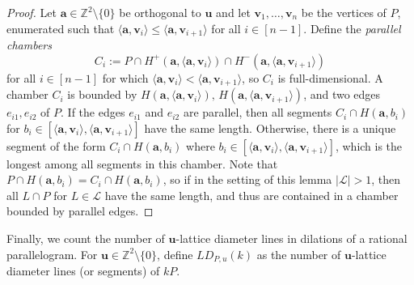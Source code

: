 \documentclass[11pt]{article}
\newcommand{\ba}{\mathbf{a}}
\newcommand{\bu}{\mathbf{u}}
\newcommand{\bv}{\mathbf{v}}
\newcommand{\Z}{\mathbb{Z}}
\newcommand{\Lcal}{\mathcal{L}}
\begin{document}
\begin{proof}
    Let $\ba \in \Z^2\setminus \{0\}$ be orthogonal to $\bu$ and let $\bv_1, \ldots, \bv_n$ be the vertices of $P$, enumerated such that $\langle \ba, \bv_i \rangle \leq \langle \ba,\bv_{i+1} \rangle$ for all $i \in [n-1]$. Define the \textit{parallel chambers}
    \[
    C_i:= P \cap H^+(\ba,\langle \ba,\bv_i \rangle ) \cap H^-(\ba,\langle \ba,\bv_{i+1} \rangle )
    \]
    for all $i \in [n-1]$ for which $\langle \ba,\bv_i \rangle < \langle \ba , \bv_{i+1} \rangle$, so $C_i$ is full-dimensional. A chamber $C_i$ is bounded by $H(\ba,\langle \ba, \bv_i\rangle), \, H(\ba,\langle \ba, \bv_{i+1}\rangle)$, and two edges $e_{i1},e_{i2}$ of $P$. If the edges $e_{i1}$ and $e_{i2}$ are parallel, then all segments $C_i \cap H(\ba,b_i)$ for $b_i \in [ \langle \ba,\bv_i \rangle, \langle \ba,\bv_{i+1} \rangle]$ have the same length. Otherwise, there is a unique segment of the form $C_i \cap H(\ba,b_i)$ where $b_i \in [ \langle \ba,\bv_i \rangle, \langle \ba,\bv_{i+1} \rangle]$, which is the longest among all segments in this chamber. Note that $P \cap H(\ba,b_i) = C_i \cap H(\ba,b_i)$, so if in the setting of this lemma $|\Lcal|>1$, then all $L \cap P$ for $L \in \Lcal$ have the same length, and thus are contained in a chamber bounded by parallel edges.
\end{proof}

Finally, we count the number of $\bu$-lattice diameter lines in dilations of a rational parallelogram. For $\bu \in \Z^{2} \setminus \{0\}$, define $LD_{P,u}(k)$ as the number of $\bu$-lattice diameter lines (or segments) of $kP$.
\end{document}
